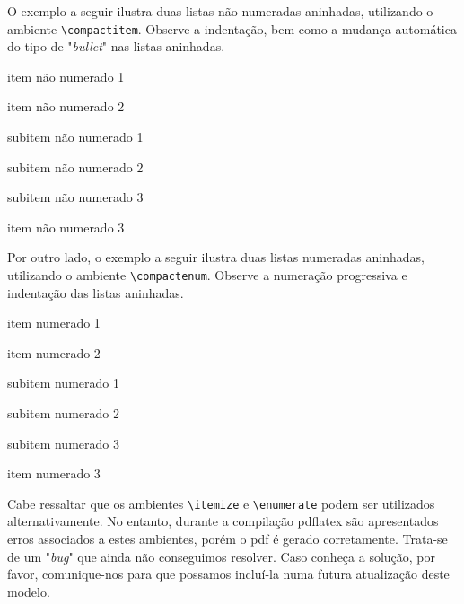 \begin{apendicesenv}
O exemplo a seguir ilustra duas listas não numeradas aninhadas, utilizando o ambiente \verb|\compactitem|. Observe a indentação, bem como a mudança automática do tipo de "\textit{bullet}"{} nas listas aninhadas.



\begin{compactitem}
	\item item não numerado 1
	\item item não numerado 2
	\begin{compactitem}
		\item subitem não numerado 1
		\item subitem não numerado 2
		\item subitem não numerado 3
	\end{compactitem}
	\item item não numerado 3
\end{compactitem}


Por outro lado, o exemplo a seguir ilustra duas listas numeradas aninhadas, utilizando o ambiente \verb|\compactenum|. Observe a numeração progressiva e indentação das listas aninhadas.


\begin{compactenum}
	\item item numerado 1
	\item item numerado 2
	\begin{compactenum}
		\item subitem numerado 1
		\item subitem numerado 2
		\item subitem numerado 3
	\end{compactenum}
	\item item numerado 3
\end{compactenum}

Cabe ressaltar que os ambientes \verb|\itemize| e \verb|\enumerate| podem ser utilizados alternativamente. No entanto, durante a compilação pdflatex são apresentados erros associados a estes ambientes, porém o pdf é gerado corretamente. Trata-se de um "\textit{bug}"{} que ainda não conseguimos resolver. Caso conheça a solução, por favor, comunique-nos para que possamos incluí-la numa futura atualização deste modelo.






\end{apendicesenv}
